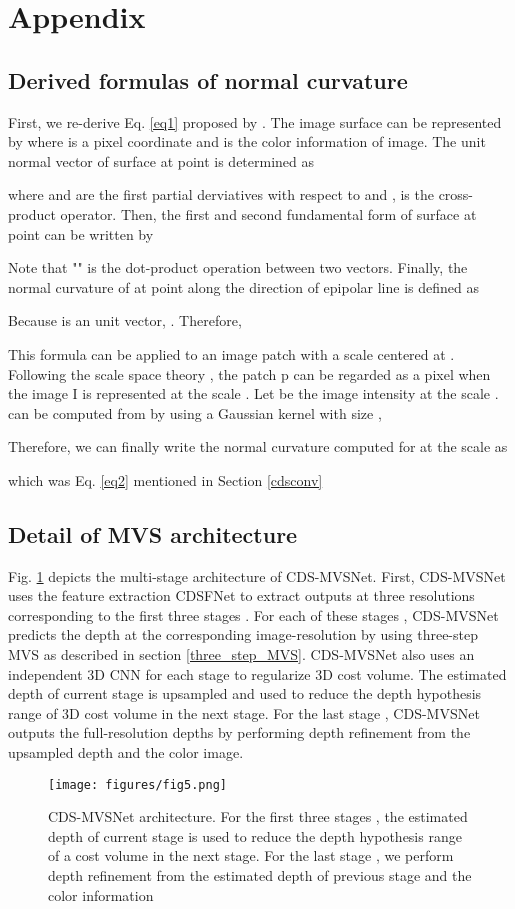 \documentclass{article} \usepackage{iclr2022_conference,times}
\begin{document}
\appendix
\section{Appendix}
\subsection{Derived formulas of normal curvature}
First, we re-derive Eq. \ref{eq1} proposed by \cite{xu2020marmvs}. The image surface can be represented by 
where  is a pixel coordinate and  is the color information of image. The unit normal vector of surface  at point  is determined as

where  and  are the first partial derviatives with respect to  and ,  is the cross-product operator. Then, the first and second fundamental form of surface  at point  can be written by

Note that "" is the dot-product operation between two vectors. Finally, the normal curvature of  at point  along the direction  of epipolar line is defined as

Because  is an unit vector, . Therefore,

This formula can be applied to an image patch  with a scale  centered at . Following the scale space theory \citep{lindeberg1994scale}, the patch p can be regarded as a pixel when the image I is represented at the scale . Let  be the image intensity at the scale .  can be computed from  by using a Gaussian kernel with size , 

Therefore, we can finally write the normal curvature computed for  at the scale  as

which was Eq. \ref{eq2} mentioned in Section \ref{cdsconv}

\subsection{Detail of MVS architecture}
Fig. \ref{fig5} depicts the multi-stage architecture of CDS-MVSNet. First, CDS-MVSNet uses the feature extraction CDSFNet to extract outputs at three resolutions  corresponding to the first three stages . For each of these stages , CDS-MVSNet predicts the depth at the corresponding image-resolution  by using three-step MVS as described in section \ref{three_step_MVS}. CDS-MVSNet also uses an independent 3D CNN for each stage to regularize 3D cost volume. The estimated depth of current stage is upsampled and used to reduce the depth hypothesis range of 3D cost volume in the next stage. For the last stage , CDS-MVSNet outputs the full-resolution depths by performing depth refinement from the upsampled depth and the color image.
\begin{figure}[h]
\begin{center}
\texttt{[image: figures/fig5.png]}
\end{center}
\caption{CDS-MVSNet architecture. For the first three stages , the estimated depth of current stage is used to reduce the depth hypothesis range of a cost volume in the next stage. For the last stage , we perform depth refinement from the estimated depth of previous stage and the color information}
\label{fig5}
\end{figure}
\end{document}
